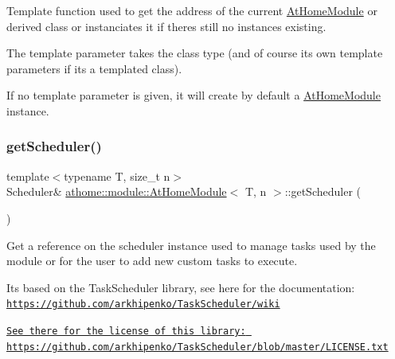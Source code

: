 Template function used to get the address of the current \mbox{\hyperlink{classathome_1_1module_1_1_at_home_module}{At\+Home\+Module}} or derived class or instanciates it if there\textquotesingle{}s still no instances existing.

The template parameter takes the class type (and of course it\textquotesingle{}s own template parameters if it\textquotesingle{}s a templated class).

If no template parameter is given, it will create by default a \mbox{\hyperlink{classathome_1_1module_1_1_at_home_module}{At\+Home\+Module}} instance. \mbox{\label{classathome_1_1module_1_1_at_home_module_a954f37f05e5738f270a35fef58782ba6}} 
\subsubsection{\texorpdfstring{get\+Scheduler()}{getScheduler()}}
{\footnotesize\ttfamily template$<$typename T, size\+\_\+t n$>$ \\
Scheduler\& \mbox{\hyperlink{classathome_1_1module_1_1_at_home_module}{athome\+::module\+::\+At\+Home\+Module}}$<$ T, n $>$\+::get\+Scheduler (\begin{DoxyParamCaption}{ }\end{DoxyParamCaption})\hspace{0.3cm}{\ttfamily [inline]}}

Get a reference on the scheduler instance used to manage tasks used by the module or for the user to add new custom tasks to execute.

It\textquotesingle{}s based on the Task\+Scheduler library, see here for the documentation\+: \href{https://github.com/arkhipenko/TaskScheduler/wiki}{\tt https\+://github.\+com/arkhipenko/\+Task\+Scheduler/wiki}

\href{https://github.com/arkhipenko/TaskScheduler/blob/master/LICENSE.txt}{\tt See there for the license of this library\+: https\+://github.\+com/arkhipenko/\+Task\+Scheduler/blob/master/\+L\+I\+C\+E\+N\+S\+E.\+txt} \mbox{\label{classathome_1_1module_1_1_at_home_module_ae0d4458da2bafd104386671d300fb562}} 
